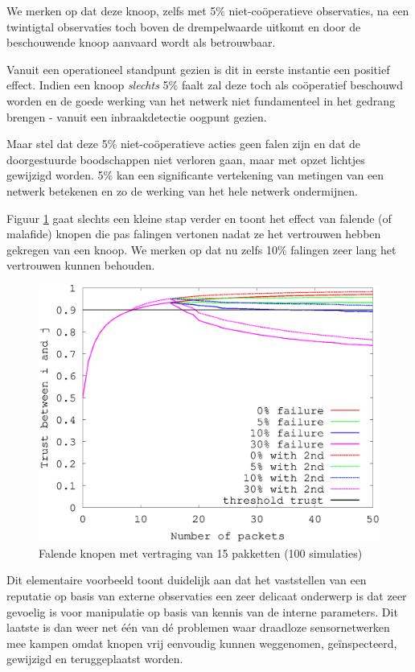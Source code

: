 We merken op dat deze knoop, zelfs met 5\% niet-co\"operatieve observaties, na
een twintigtal observaties toch boven de drempelwaarde uitkomt en door de
beschouwende knoop aanvaard wordt als betrouwbaar.

Vanuit een operationeel standpunt gezien is dit in eerste instantie een
positief effect. Indien een knoop \emph{slechts} 5\% faalt zal deze toch als
co\"operatief beschouwd worden en de goede werking van het netwerk niet
fundamenteel in het gedrang brengen - vanuit een inbraakdetectie oogpunt gezien.

Maar stel dat deze 5\% niet-co\"operatieve acties geen falen zijn en dat de
doorgestuurde boodschappen niet verloren gaan, maar met opzet lichtjes
gewijzigd worden. 5\% kan een significante vertekening van metingen van een
netwerk betekenen en zo de werking van het hele netwerk ondermijnen.

Figuur \ref{fig:reputation-malicious} gaat slechts een kleine stap verder en
toont het effect van falende (of malafide) knopen die pas falingen vertonen
nadat ze het vertrouwen hebben gekregen van een knoop. We merken op dat nu zelfs
10\% falingen zeer lang het vertrouwen kunnen behouden.

\begin{figure}[ht]
 \centering
 \includegraphics[width=.5\linewidth]{./resources/reputation-malicious.eps}
 \caption{Falende knopen met vertraging van 15 pakketten (100 simulaties)}
 \label{fig:reputation-malicious}
\end{figure}

Dit elementaire voorbeeld toont duidelijk aan dat het vaststellen van een
reputatie op basis van externe observaties een zeer delicaat onderwerp is dat
zeer gevoelig is voor manipulatie op basis van kennis van de interne
parameters. Dit laatste is dan weer net \'e\'en van d\'e problemen waar
draadloze sensornetwerken mee kampen omdat knopen vrij eenvoudig kunnen
weggenomen, ge\"inspecteerd, gewijzigd en teruggeplaatst worden.
